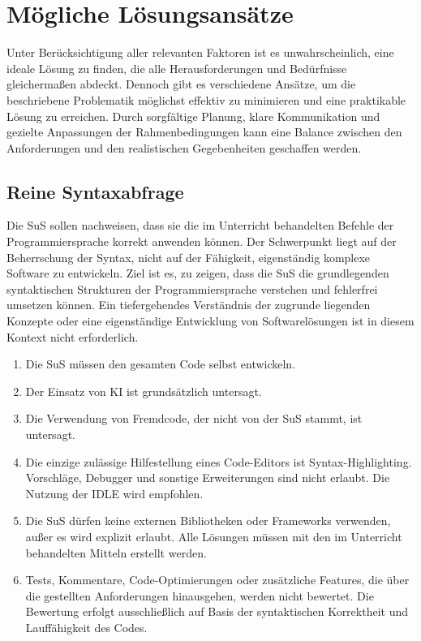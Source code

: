 \documentclass[a4paper,12pt]{article}
\begin{document}
\section{Mögliche Lösungsansätze}
Unter Berücksichtigung aller relevanten Faktoren ist es unwahrscheinlich, eine ideale Lösung zu finden, die alle Herausforderungen und Bedürfnisse gleichermaßen abdeckt. Dennoch gibt es verschiedene Ansätze, um die beschriebene Problematik möglichst effektiv zu minimieren und eine praktikable Lösung zu erreichen. Durch sorgfältige Planung, klare Kommunikation und gezielte Anpassungen der Rahmenbedingungen kann eine Balance zwischen den Anforderungen und den realistischen Gegebenheiten geschaffen werden.


\subsection{Reine Syntaxabfrage}
Die SuS sollen nachweisen, dass sie die im Unterricht behandelten Befehle der Programmiersprache korrekt anwenden können. Der Schwerpunkt liegt auf der Beherrschung der Syntax, nicht auf der Fähigkeit, eigenständig komplexe Software zu entwickeln. Ziel ist es, zu zeigen, dass die SuS die grundlegenden syntaktischen Strukturen der Programmiersprache verstehen und fehlerfrei umsetzen können. Ein tiefergehendes Verständnis der zugrunde liegenden Konzepte oder eine eigenständige Entwicklung von Softwarelösungen ist in diesem Kontext nicht erforderlich.

\begin{enumerate}[label=\S\ \arabic*]
    \item Die SuS müssen den gesamten Code selbst entwickeln.
    \item Der Einsatz von KI ist grundsätzlich untersagt.
    \item Die Verwendung von Fremdcode, der nicht von der SuS stammt, ist untersagt.
    \item Die einzige zulässige Hilfestellung eines Code-Editors ist Syntax-Highlighting. Vorschläge, Debugger und sonstige Erweiterungen sind nicht erlaubt. Die Nutzung der IDLE wird empfohlen.
    \item Die SuS dürfen keine externen Bibliotheken oder Frameworks verwenden, außer es wird explizit erlaubt. Alle Lösungen müssen mit den im Unterricht behandelten Mitteln erstellt werden.
    \item Tests, Kommentare, Code-Optimierungen oder zusätzliche Features, die über die gestellten Anforderungen hinausgehen, werden nicht bewertet. Die Bewertung erfolgt ausschließlich auf Basis der syntaktischen Korrektheit und Lauffähigkeit des Codes.
\end{enumerate}
\end{document}
